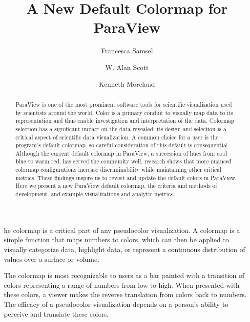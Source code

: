 \documentclass{IEEEcsmag}
\begin{document}

\title{A New Default Colormap for ParaView}

\author{Francesca Samsel}

\author{W. Alan Scott}

\author{Kenneth Moreland}




\begin{abstract}
ParaView is one of the most prominent software tools for scientific visualization used by scientists around the world.
Color is a primary conduit to visually map data to its representation and thus enable investigation and interpretation of the data.
Colormap selection has a significant impact on the data revealed; its design and selection is a critical aspect of scientific data visualization.
A common choice for a user is the program's default colormap, so careful consideration of this default is consequential.
Although the current default colormap in ParaView, a succession of hues from cool blue to warm red, has served the community well, research shows that more nuanced colormap configurations increase discriminability while maintaining other critical metrics.
These findings inspire us to revisit and update the default colors in ParaView.
Here we present a new ParaView default colormap, the criteria and methods of development, and example visualizations and analytic metrics.
\end{abstract}

\maketitle

he colormap is a critical part of any pseudocolor visualization.
A colormap is a simple function that maps numbers to colors, which can then be applied to visually categorize data, highlight data, or represent a continuous distribution of values over a surface or volume.

The colormap is most recognizable to users as a bar painted with a transition of colors representing a range of numbers from low to high.
When presented with these colors, a viewer makes the reverse translation from colors back to numbers. The efficacy of a pseudocolor visualization depends on a person's ability to perceive and translate these colors.
\end{document}
